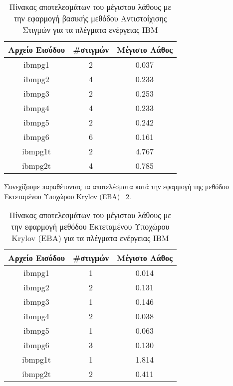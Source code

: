 \begin{table}[h!]
\centering
 \begin{tabular}{||c | c | c||} 
 \hline
 Αρχείο Εισόδου & \textlatin{\#}στιγμών & Μέγιστο Λάθος \\ [0.5ex] 
 \hline\hline
 \textlatin{ibmpg1} & 2 & 0.037 \\ 
 \hline
 \textlatin{ibmpg2} & 4 & 0.233 \\
 \hline
 \textlatin{ibmpg3} & 2 & 0.253 \\
 \hline
 \textlatin{ibmpg4} & 4 & 0.233 \\
 \hline
 \textlatin{ibmpg5} & 2 & 0.242 \\
 \hline
 \textlatin{ibmpg6} & 6 & 0.161 \\
 \hline
 \textlatin{ibmpg1t} & 2 & 4.767 \\
 \hline
 \textlatin{ibmpg2t} & 4 & 0.785 \\
 \hline
\end{tabular}
\caption{Πίνακας αποτελεσμάτων του μέγιστου λάθους με την εφαρμογή βασικής μεθόδου Αντιστοίχισης Στιγμών για τα πλέγματα ενέργειας \textlatin{IBM}}
\label{table:BasicMM}
\end{table}



Συνεχίζουμε παραθέτοντας τα αποτελέσματα κατά την εφαρμογή της μεθόδου Εκτεταμένου Υποχώρου \textlatin{Krylov} (\textlatin{EBA}) ~\ref{table:ResultsEBAMaxError}.

\begin{table}[h!]
\centering
 \begin{tabular}{||c | c | c||} 
 \hline
 Αρχείο Εισόδου & \textlatin{\#}στιγμών & Μέγιστο Λάθος \\ [0.5ex] 
 \hline\hline
 \textlatin{ibmpg1} & 1 & 0.014 \\ 
 \hline
 \textlatin{ibmpg2} & 2 & 0.131 \\
 \hline
 \textlatin{ibmpg3} & 1 & 0.146 \\
 \hline
 \textlatin{ibmpg4} & 2 & 0.038 \\
 \hline
 \textlatin{ibmpg5} & 1 & 0.063 \\
 \hline
 \textlatin{ibmpg6} & 3 & 0.130 \\
 \hline
 \textlatin{ibmpg1t} & 1 & 1.814 \\
 \hline
 \textlatin{ibmpg2t} & 2 & 0.411 \\
 \hline
\end{tabular}
\caption{Πίνακας αποτελεσμάτων του μέγιστου λάθους με την εφαρμογή μεθόδου Εκτεταμένου Υποχώρου \textlatin{Krylov} (\textlatin{EBA}) για τα πλέγματα ενέργειας \textlatin{IBM}}
\label{table:ResultsEBAMaxError}
\end{table}

